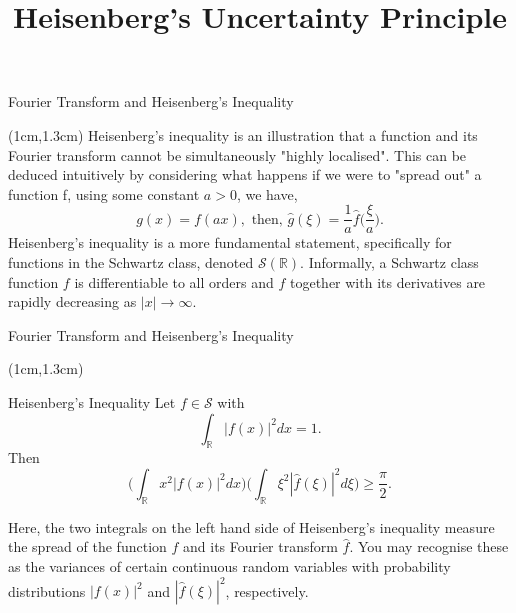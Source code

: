 \documentclass{beamer}
\title{Heisenberg's Uncertainty Principle}
\author{}
\date{}
\begin{document}

\begin{frame}{Fourier Transform and Heisenberg's Inequality}

\begin{textblock*}{11cm}(1cm,1.3cm)
Heisenberg's inequality is an illustration that a function and its Fourier transform cannot be simultaneously "highly localised". This can be deduced intuitively by considering what happens if we were to "spread out" a function f, using some constant $a>0$, we have, $$g(x)=f(ax), \text{ then, } \hat{g}(\xi)=\frac{1}{a}\hat{f}\bigg(\frac{\xi}{a}\bigg).$$
Heisenberg's inequality is a more fundamental statement, specifically for functions in the Schwartz class, denoted $\mathcal{S}(\mathbb{R})$. Informally, a Schwartz class function $f$ is differentiable to all orders and $f$ together with its derivatives are rapidly decreasing as $|x|\to\infty$.
\end{textblock*}
\end{frame}

\logo{}


\begin{frame}{Fourier Transform and Heisenberg's Inequality}
\begin{textblock*}{11cm}(1cm,1.3cm)

\begin{block}{Heisenberg's Inequality}
Let $f\in\mathcal{S}$ with $$\int_{\mathbb{R}}|f(x)|^{2}dx=1.$$
Then $$\Bigg(\int_{\mathbb{R}}x^{2}|f(x)|^{2}dx\Bigg)\Bigg(\int_{\mathbb{R}}\xi^{2}|\hat{f}(\xi)|^{2}d\xi\Bigg) \geq \frac{\pi}{2}.$$
\end{block}
Here, the two integrals on the left hand side of Heisenberg's inequality measure the spread of the function $f$ and its Fourier transform $\hat{f}$. You may recognise these as the variances of certain continuous random variables with probability distributions $|f(x)|^{2}$ and $|\hat{f}(\xi)|^{2}$, respectively.
\end{textblock*}
\end{frame}
\end{document}
